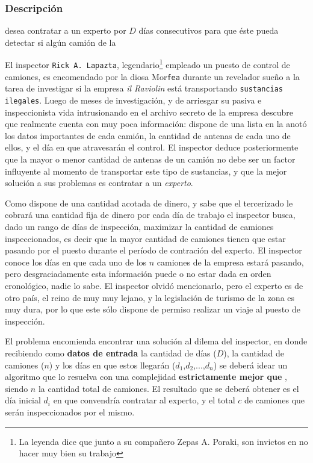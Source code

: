 \documentclass[11pt, a4paper, twoside]{article}
\begin{document}
{}

\subsubsection{Descripción} 

desea contratar a un experto
por $D$ días consecutivos
para que éste pueda detectar si algún camión de la

El inspector \texttt{Rick A. Lapazta}, legendario\footnote{La leyenda dice que
junto a su compañero Zepas A. Poraki, son invictos en no hacer muy bien su
trabajo} empleado un puesto de control de camiones, es encomendado por la diosa
Mor\texttt{fea} durante un revelador sueño a la tarea de investigar si la
empresa \textit{il Raviolin} está transportando \texttt{sustancias ilegales}.
Luego de meses de investigación, y de arriesgar su pasiva e inspeccionista vida
intrusionando en el archivo secreto de la empresa descubre que realmente cuenta
con muy poca información: dispone de una lista en la anotó los datos importantes
de cada camión, la cantidad de antenas de cada uno de ellos, y el día en que
atravesarán el control. El inspector deduce posteriormente que la mayor o menor
cantidad de antenas de un camión no debe ser un factor influyente al momento de
transportar este tipo de sustancias, y que la mejor solución a sus problemas es
contratar a un \textit{experto}. 

Como dispone de una cantidad acotada de dinero, y sabe que el tercerizado le
cobrará una cantidad fija de dinero por cada día de trabajo el inspector busca,
dado un rango de días de inspección, maximizar la cantidad de camiones
inspeccionados, es decir que la mayor cantidad de camiones tienen que estar
pasando por el puesto durante el período de contración del experto. El inspector
conoce los días en que cada uno de los $n$ camiones de la empresa estará
pasando, pero desgraciadamente esta información puede o no estar dada en orden
cronológico, nadie lo sabe. El inspector olvidó mencionarlo, pero el experto es
de otro país, el reino de muy muy lejano, y la legislación de turismo de la zona
es muy dura, por lo que este sólo dispone de permiso realizar un viaje al puesto
de inspección.

El problema encomienda encontrar una solución al dilema del inspector, en donde
recibiendo como \textbf{datos de entrada} la cantidad de días ($D$), la cantidad
de camiones ($n$) y los días en que estos llegarán ($d_1$,$d_2$,...,$d_n$) se
deberá idear un algoritmo que lo resuelva con una complejidad
\textbf{estrictamente mejor que} , siendo $n$ la cantidad total de
camiones. El resultado que se deberá obtener es el día inicial $d_i$ en que
convendría contratar al experto, y el total $c$ de camiones que serán
inspeccionados por el mismo.
\end{document}
